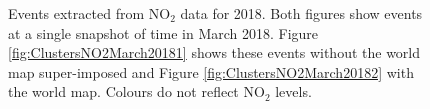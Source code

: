 \documentclass[11pt]{article}
\begin{document}
	
	\begin{figure}[H]
		\centering
		\caption{\footnotesize Events extracted from $\text{NO}_2$ data for 2018. Both figures show events at a single snapshot of time in March 2018. Figure \ref{fig:ClustersNO2March20181} shows these events without the world map super-imposed and Figure \ref{fig:ClustersNO2March20182}  with the world map. Colours do not reflect $\text{NO}_2$ levels.}
		\label{fig:ClustersNO2March2018}
	\end{figure}
	
\end{document}
